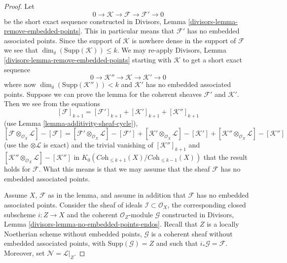 \begin{proof}
Let
$$
0 \to \mathcal{K} \to \mathcal{F} \to \mathcal{F}' \to 0
$$
be the short exact sequence constructed in
Divisors, Lemma \ref{divisors-lemma-remove-embedded-points}.
This in particular means that $\mathcal{F}'$ has no embedded
associated points.
Since the support of $\mathcal{K}$ is nowhere dense in the
support of $\mathcal{F}$ we see that
$\dim_\delta(\text{Supp}(\mathcal{K})) \leq k$. We may
re-apply
Divisors, Lemma \ref{divisors-lemma-remove-embedded-points}
starting with $\mathcal{K}$ to get a short exact sequence
$$
0 \to \mathcal{K}'' \to \mathcal{K} \to \mathcal{K}' \to 0
$$
where now $\dim_\delta(\text{Supp}(\mathcal{K}'')) < k$
and $\mathcal{K}'$ has no embedded associated points.
Suppose we can prove the lemma for the coherent sheaves
$\mathcal{F}'$ and $\mathcal{K}'$. Then we see
from the equations
$$
[\mathcal{F}]_{k + 1}
=
[\mathcal{F}']_{k + 1}
+ [\mathcal{K}']_{k + 1}
+ [\mathcal{K}'']_{k + 1}
$$
(use Lemma \ref{lemma-additivity-sheaf-cycle}),
$$
[\mathcal{F} \otimes_{\mathcal{O}_X} \mathcal{L}]
-
[\mathcal{F}]
=
[\mathcal{F}' \otimes_{\mathcal{O}_X} \mathcal{L}]
-
[\mathcal{F}']
+
[\mathcal{K}' \otimes_{\mathcal{O}_X} \mathcal{L}]
-
[\mathcal{K}']
+
[\mathcal{K}'' \otimes_{\mathcal{O}_X} \mathcal{L}]
-
[\mathcal{K}'']
$$
(use the $\otimes \mathcal{L}$ is exact)
and the trivial vanishing of $[\mathcal{K}'']_{k + 1}$ and
$[\mathcal{K}'' \otimes_{\mathcal{O}_X} \mathcal{L}]
- [\mathcal{K}'']$ in
$K_0(\textit{Coh}_{\leq k + 1}(X)/\textit{Coh}_{\leq k - 1}(X))$
that the result holds
for $\mathcal{F}$. What this means is that we may assume that
the sheaf $\mathcal{F}$ has no embedded associated points.

\medskip\noindent
Assume $X$, $\mathcal{F}$ as in the lemma, and assume in addition
that $\mathcal{F}$ has no embedded associated points. Consider the
sheaf of ideals $\mathcal{I} \subset \mathcal{O}_X$, the corresponding
closed subscheme $i : Z \to X$ and the coherent $\mathcal{O}_Z$-module
$\mathcal{G}$ constructed in
Divisors, Lemma \ref{divisors-lemma-no-embedded-points-endos}.
Recall that $Z$ is a locally Noetherian scheme without embedded points,
$\mathcal{G}$ is a coherent sheaf without embedded
associated points, with $\text{Supp}(\mathcal{G}) = Z$
and such that $i_*\mathcal{G} = \mathcal{F}$.
Moreover, set $\mathcal{N} = \mathcal{L}|_Z$.


\end{proof}
